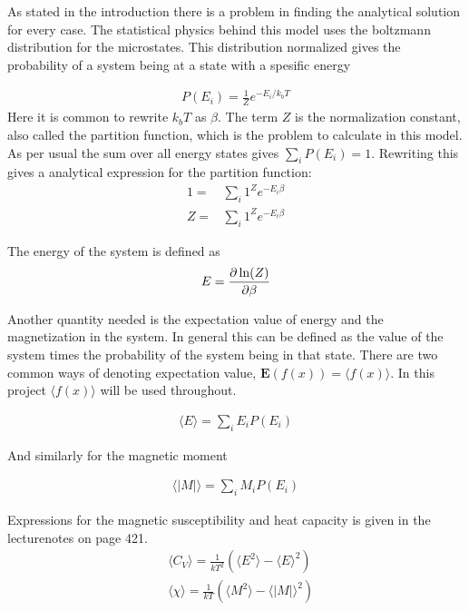 As stated in the introduction there is a problem in finding the analytical solution for every case. The statistical physics behind this model uses the boltzmann distribution  for the microstates. This distribution normalized gives the probability of a system being at a state with a spesific energy

\begin{align}
	P(E_i)=\frac{1}{Z}e^{-E_i/k_bT}\label{probability}
\end{align}
Here it is common to rewrite $k_bT$ as $\beta$. The term $Z$ is the normalization constant, also called the partition function, which is the problem to calculate in this model. As per usual the sum over all energy states gives $\sum_iP(E_i)=1$. Rewriting this gives a analytical expression for the partition function:
\begin{align*}
	1=&\sum_i{1}^{Z}e^{-E_i \beta}\\
	Z=&\sum_i{1}^{Z}e^{-E_i \beta}
\end{align*}

The energy of the system is defined as
\begin{align}
	E=\pdv{\ln(Z)}{\beta}\label{defenergy}
\end{align}

Another quantity needed is the expectation value of energy and the magnetization in the system. In general this can be defined as the value of the system times the probability of the system being in that state. There are two common ways of denoting expectation value, $\mathbf{E}(f(x))=\langle f(x)\rangle $. In this project $\langle f(x)\rangle $ will be used throughout. 

\begin{align}
	\langle E \rangle= \sum_iE_iP(E_i)\label{expectationvalue}
\end{align}

And similarly for the magnetic moment

\begin{align}
\langle |M| \rangle= \sum_iM_iP(E_i)\label{expectationvalue_}
\end{align}

Expressions for the magnetic susceptibility and heat capacity is given in the lecturenotes on page 421\cite{compphys}. 
\begin{align}
&\langle C_V \rangle = \frac{1}{k T^2}
\left(
\langle E^2 \rangle - \langle E \rangle ^2
\right)
\label{eq:cv}
\\
&\langle \chi \rangle = \frac{1}{kT} 
\left(
\langle M^2 \rangle - \langle |M| \rangle ^2
\right)
\label{eq:chi}
\end{align}



